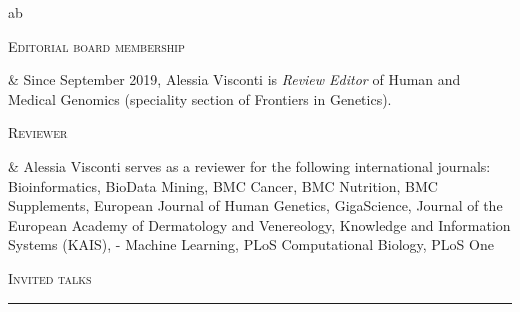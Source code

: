 \documentclass[a4paper,10pt]{article}
\newcommand{\mediumtitle}[1]{
	\vspace{0.2cm}
	{\noindent
	\Large \textsc{#1}\\[-2ex]
	\hrule
	\vspace{0.2cm}}
}
\newenvironment{singletablelist}
{	\vspace{-0.2cm}
	\begin{longtable}[!h]{ab}}{\end{longtable}
}
\newcommand{\stlist}[2]{
	\hspace{-3cm}
	\noindent
	\begin{minipage}{0.24\textwidth}
	\begin{flushright}
	\textsc{#1}
	\end{flushright}
	\end{minipage}
	& #2\\[0.2cm]
}
\begin{document}
\begin{singletablelist}

\stlist{Editorial board membership}{ Since September 2019, Alessia Visconti is \emph{Review Editor} of Human and Medical Genomics (speciality section of Frontiers in Genetics).}
\stlist{Reviewer}{ Alessia Visconti serves as a reviewer for the following international journals: Bioinformatics, BioData Mining, BMC Cancer, BMC Nutrition, BMC Supplements, European Journal of Human Genetics, GigaScience, Journal of the European Academy of Dermatology and Venereology, Knowledge and Information Systems (KAIS), - Machine Learning, PLoS Computational Biology, PLoS One
}
\end{singletablelist}

\newpage

\mediumtitle{Invited talks}
\end{document}
